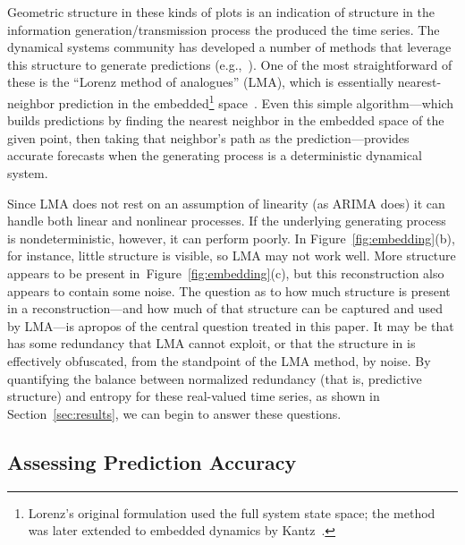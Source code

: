 Geometric structure in these kinds of plots is an indication of
structure in the information generation/transmission process the
produced the time series.  The dynamical systems community has
developed a number of methods that leverage this structure to generate
predictions (e.g.,~\cite{weigend-book,casdagli-eubank92,Smith199250}).
One of the most straightforward of these is the ``Lorenz method of
analogues'' (LMA), which is essentially nearest-neighbor prediction in
the embedded\footnote{Lorenz's original formulation used the full
  system state space; the method was later extended to embedded
  dynamics by Kantz~\cite{kantz-lma-citation}.}
space~\cite{lorenz-analogues}.  Even this simple algorithm---which
builds predictions by finding the nearest neighbor in the embedded
space of the given point, then taking that neighbor's path as the
prediction---provides accurate forecasts when the generating process
is a deterministic dynamical system.  

Since LMA does not rest on an assumption of linearity (as ARIMA does)
it can handle both linear and nonlinear processes.  If the underlying
generating process is nondeterministic, however, it can perform
poorly.  In Figure~\ref{fig:embedding}(b), for instance, little
structure is visible, so LMA may not work well.  More structure
appears to be present in~Figure~\ref{fig:embedding}(c), but this
reconstruction also appears to contain some noise.  The question as to
how much structure is present in a reconstruction---and how much of
that structure can be captured and used by LMA---is apropos of the
central question treated in this paper.  It may be that \gcc has some
redundancy that LMA cannot exploit, or that the structure in \svdfive
is effectively obfuscated, from the standpoint of the LMA method, by
noise.  By quantifying the balance between normalized redundancy (that
is, predictive structure) and entropy for these real-valued time
series, as shown in Section~\ref{sec:results}, we can begin to answer
these questions.


\subsection{Assessing Prediction Accuracy}
\label{sec:accuracy}

